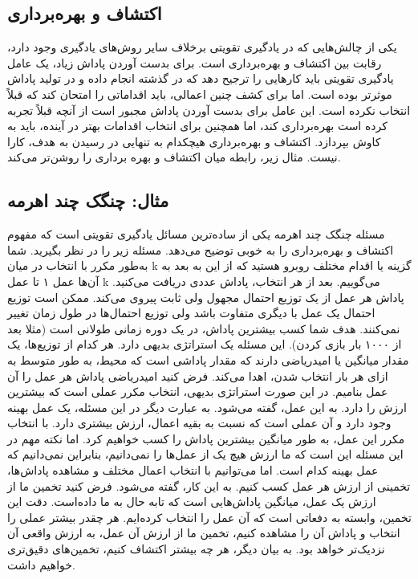 \subsection*{اکتشاف و بهره‌برداری}
یکی از چالش‌هایی که در یادگیری تقویتی برخلاف سایر روش‌های یادگیری وجود دارد، رقابت بین اکتشاف و بهره‌برداری است. برای بدست آوردن پاداش زیاد، یک عامل یادگیری تقویتی باید کارهایی را ترجیح دهد که در گذشته انجام داده و در تولید پاداش موثرتر بوده است. اما برای کشف چنین اعمالی، باید اقداماتی را امتحان کند که قبلاً انتخاب نکرده است. این عامل برای بدست آوردن پاداش مجبور است از آنچه قبلاً تجربه کرده است بهره‌برداری کند، اما همچنین برای انتخاب اقدامات بهتر در آینده، باید به کاوش بپردازد. 
اکتشاف و بهره‌برداری هیچکدام به تنهایی در رسیدن به هدف، کارا نیست. مثال زیر، رابطه میان اکتشاف و بهره برداری را روشن‌تر می‌کند.
\subsection{مثال: چنگک چند اهرمه}
مسئله چنگک چند اهرمه یکی از ساده‌ترین مسائل یادگیری تقویتی است که مفهوم اکتشاف و بهره‌برداری را به خوبی توضیح می‌دهد. مسئله زیر را در نظر بگیرید. شما به‌طور مکرر با انتخاب در میان k گزینه یا اقدام مختلف روبرو هستید که از این به بعد به آن‌ها عمل ۱ تا عمل k می‌گوییم. بعد از هر انتخاب، پاداش عددی دریافت می‌کنید. پاداش هر عمل از یک توزیع احتمال مجهول ولی ثابت پیروی می‌کند. ممکن است توزیع احتمال یک عمل با دیگری متفاوت باشد ولی توزیع احتمال‌ها در طول زمان تغییر نمی‌کنند. هدف شما کسب بیشترین پاداش، در یک دوره زمانی طولانی است (مثلا بعد از ۱۰۰۰ بار بازی کردن). 
 این مسئله یک استراتژی بدیهی دارد. هر کدام از توزیع‌ها، یک مقدار میانگین یا امیدریاضی دارند که مقدار پاداشی است که محیط، به طور متوسط به ازای هر بار انتخاب شدن، اهدا می‌کند. فرض کنید امیدریاضی پاداش هر عمل را  آن عمل بنامیم. در این صورت استراتژی بدیهی، انتخاب مکرر عملی است که بیشترین ارزش را دارد. به این عمل،  
 گفته می‌شود. به عبارت دیگر در این مسئله، یک عمل بهینه وجود دارد و آن عملی است که نسبت به بقیه اعمال، ارزش بیشتری دارد. با انتخاب مکرر این عمل، به طور میانگین بیشترین پاداش را کسب خواهیم کرد. اما نکته مهم در این مسئله این است که ما ارزش هیچ یک از عمل‌ها را نمی‌دانیم، بنابراین نمی‌دانیم که عمل بهینه کدام است. اما می‌توانیم با انتخاب اعمال مختلف و مشاهده پاداش‌ها، تخمینی از ارزش هر عمل کسب کنیم. به این کار،  گفته می‌شود. فرض کنید تخمین ما از ارزش یک عمل، میانگین پاداش‌هایی است که تابه حال به ما داده‌است. دقت این تخمین، وابسته به دفعاتی است که آن عمل را انتخاب کرده‌ایم. هر چقدر بیشتر عملی را انتخاب و پاداش آن را مشاهده کنیم، تخمین ما از ارزش آن عمل، به ارزش واقعی آن نزدیک‌تر خواهد بود. به بیان دیگر، هر چه بیشتر اکتشاف کنیم، تخمین‌های دقیق‌تری خواهیم داشت.
